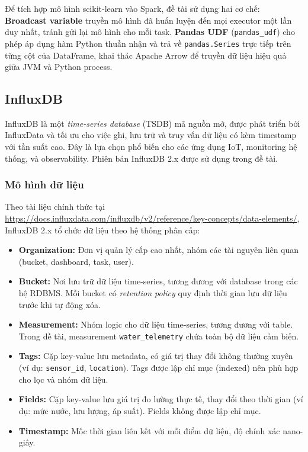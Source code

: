 Để tích hợp mô hình scikit-learn vào Spark, đề tài sử dụng hai cơ chế:
\textbf{Broadcast variable} truyền mô hình đã huấn luyện đến mọi executor một lần
duy nhất, tránh gửi lại mô hình cho mỗi task. \textbf{Pandas UDF}
(\texttt{pandas\_udf}) cho phép áp dụng hàm Python thuần nhận và trả về
\texttt{pandas.Series} trực tiếp trên từng cột của DataFrame, khai thác Apache
Arrow để truyền dữ liệu hiệu quả giữa JVM và Python process.

\subsection{InfluxDB}

InfluxDB là một \emph{time-series database} (TSDB) mã nguồn mở, được phát triển
bởi InfluxData và tối ưu cho việc ghi, lưu trữ và truy vấn dữ liệu có kèm timestamp
với tần suất cao. Đây là lựa chọn phổ biến cho các ứng dụng IoT, monitoring hệ
thống, và observability. Phiên bản InfluxDB 2.x được sử dụng trong đề tài.

\subsubsection{Mô hình dữ liệu}

Theo tài liệu chính thức tại
\url{https://docs.influxdata.com/influxdb/v2/reference/key-concepts/data-elements/},
InfluxDB 2.x tổ chức dữ liệu theo hệ thống phân cấp:

\begin{itemize}
  \item \textbf{Organization:} Đơn vị quản lý cấp cao nhất, nhóm các tài nguyên
    liên quan (bucket, dashboard, task, user).
  \item \textbf{Bucket:} Nơi lưu trữ dữ liệu time-series, tương đương với
    database trong các hệ RDBMS. Mỗi bucket có \emph{retention policy} quy định
    thời gian lưu dữ liệu trước khi tự động xóa.
  \item \textbf{Measurement:} Nhóm logic cho dữ liệu time-series, tương đương với
    table. Trong đề tài, measurement \texttt{water\_telemetry} chứa toàn bộ dữ liệu
    cảm biến.
  \item \textbf{Tags:} Cặp key-value lưu metadata, có giá trị thay đổi không
    thường xuyên (ví dụ: \texttt{sensor\_id}, \texttt{location}). Tags được lập
    chỉ mục (indexed) nên phù hợp cho lọc và nhóm dữ liệu.
  \item \textbf{Fields:} Cặp key-value lưu giá trị đo lường thực tế, thay đổi
    theo thời gian (ví dụ: mức nước, lưu lượng, áp suất). Fields không được lập
    chỉ mục.
  \item \textbf{Timestamp:} Mốc thời gian liên kết với mỗi điểm dữ liệu, độ chính
    xác nano-giây.
\end{itemize}


